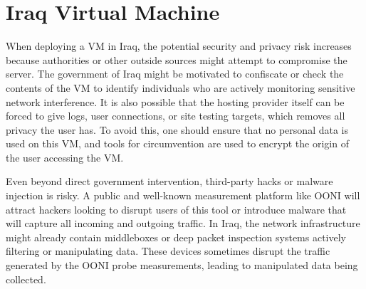 \section{Iraq Virtual Machine}

When deploying a VM in Iraq, the potential security and privacy risk increases because authorities or other outside sources might attempt to compromise the server. The government of Iraq might be motivated to confiscate or check the contents of the VM to identify individuals who are actively monitoring sensitive network interference. It is also possible that the hosting provider itself can be forced to give logs, user connections, or site testing targets, which removes all privacy the user has. To avoid this, one should ensure that no personal data is used on this VM, and tools for circumvention are used to encrypt the origin of the user accessing the VM.

Even beyond direct government intervention, third-party hacks or malware injection is risky. A public and well-known measurement platform like OONI will attract hackers looking to disrupt users of this tool or introduce malware that will capture all incoming and outgoing traffic. In Iraq, the network infrastructure might already contain middleboxes or deep packet inspection systems actively filtering or manipulating data. These devices sometimes disrupt the traffic generated by the OONI probe measurements, leading to manipulated data being collected.




